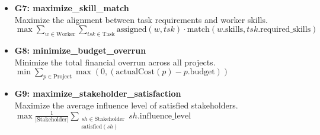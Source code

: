 \documentclass[11pt]{article}
\begin{document}
\begin{itemize}
    \item \textbf{G7: maximize\_skill\_match} \\
    Maximize the alignment between task requirements and worker skills. \\
    $\max \sum_{w \in \text{Worker}} \sum_{tsk \in \text{Task}} \text{assigned}(w, tsk) \cdot \text{match}(w.\text{skills}, tsk.\text{required\_skills})$

    \item \textbf{G8: minimize\_budget\_overrun} \\
    Minimize the total financial overrun across all projects. \\
    $\min \sum_{p \in \text{Project}} \max(0, (\text{actualCost}(p) - p.\text{budget}))$

    \item \textbf{G9: maximize\_stakeholder\_satisfaction} \\
    Maximize the average influence level of satisfied stakeholders. \\
    $\max \frac{1}{|\text{Stakeholder}|} \sum_{\substack{sh \in \text{Stakeholder} \\ \text{satisfied}(sh)}} sh.\text{influence\_level}$
\end{itemize}
\end{document}
